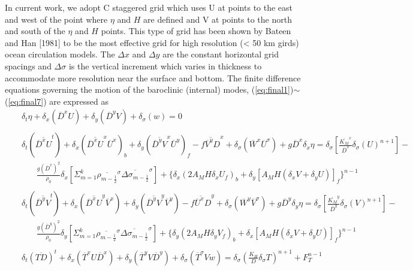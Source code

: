 \documentclass[oribibl]{llncs}
\begin{document}
In current work, we adopt C staggered grid which uses U at points to the east and west of the point where $\eta$ and $H$ are defined and V at points to the north and south of the $\eta$ and $H$ points. This type of grid has been shown by Bateen and Han [1981] to be the most effective grid for high resolution (< 50 km girds) ocean circulation models. The $\Delta x$ and $\Delta y$ are the constant horizontal grid spacings and $\Delta \sigma$ is the vertical increment which varies in thickness to accommodate more resolution near the surface and bottom.
 The finite difference equations governing the motion of the baroclinic (internal) modes, (\ref{eq:final1})$\sim$(\ref{eq:final7}) are expressed as
 \begin{eqnarray}
&&\delta_t \eta + \delta_x (\overline{D}^x U)+ \delta_y (\overline{D}^y V)+ \delta_\sigma (w)=0 \label{eq:fde1} \\ 
\nonumber \\ 
&&\delta_t (\overline{ \overline{D}^x U}^t)+\delta_x(\overline{\overline{D}^x U}^x \overline{U}^x)_b +\delta_y(\overline{\overline{D}^y V}^x \overline{U}^y)_f -\overline{f\overline{V}^y D}^x  + \delta_\sigma (\overline{W}^x \overline{U}^\sigma) + g\overline{D}^x\delta_x \eta =  \delta_\sigma \left[ \frac{\overline{K_M}^x}{\overline{D}^x} \delta_\sigma(U)^{n+1}\right]-  \nonumber \\
&&\ \ \ \ \ \ \ \    \frac{g(\overline{D}^x)^2}{\rho_0} \delta_x \left[ \Sigma_{m=1}^{k} \overline{\rho_{m-\frac{1}{2}}}^\sigma  \overline{\Delta \sigma_{m-\frac{1}{2}}}^\sigma \right] + \{\delta_x (2A_MH\delta_x U_f)_b+\delta_y [A_MH(\delta_x V + \delta_y U)]_f\}^{n-1} \label{eq:fde2} \\
\nonumber \\ 
&&\delta_t (\overline{ \overline{D}^y V}^t)+\delta_x(\overline{\overline{D}^x U}^y \overline{V}^x) +\delta_y(\overline{\overline{D}^y V}^y \overline{V}^y) -\overline{f\overline{U}^x D}^y  + \delta_\sigma (\overline{W}^y \overline{V}^\sigma) + g\overline{D}^y\delta_y \eta =  \delta_\sigma \left[ \frac{\overline{K_M}^y}{\overline{D}^y} \delta_\sigma(V)^{n+1}\right]-  \nonumber \\
&&\ \ \ \ \ \ \ \  \frac{g(\overline{D}^y)^2}{\rho_0} \delta_y \left[ \Sigma_{m=1}^{k} \overline{\rho_{m-\frac{1}{2}}}^\sigma  \overline{\Delta \sigma_{m-\frac{1}{2}}}^\sigma \right] + \{\delta_y (2A_MH\delta_y V_f)_b+\delta_x [A_MH(\delta_x V + \delta_y U)]_f\}^{n-1}  \label{eq:fde3}\\
\nonumber \\ 
&&\delta_t(\overline{T D})^t + \delta_x (\overline{T}^x U \overline{D}^x) + \delta_y (\overline{T}^y V \overline{D}^y) + \delta_\sigma (\overline{T}^\sigma V w) =  \delta_\sigma ( \frac{K_H}{D} \delta_{\sigma} T )^{n+1} + F_{T}^{n-1} \label{eq:fde4}\\

\end{eqnarray}
\end{document}
